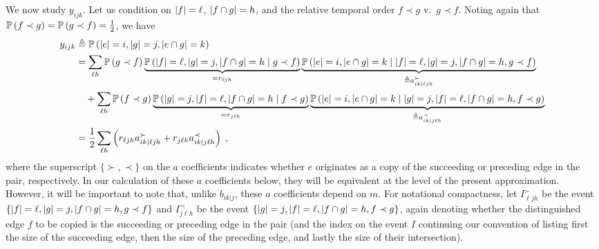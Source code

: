 We now study $y_{ijk}$. 
Let us condition on $\left\lvert f \right\rvert = \ell$, $\left\lvert f \cap g \right\rvert = h$, and the relative temporal order $f \prec g$ v.\ $g \prec f$.
Noting again that $\prob{f \prec g} = \prob{g \prec f} = \frac{1}{2}$, we have
\begin{align}
    y_{ijk} &\eqdef \prob{\abs{e} = i, \abs{g} = j, \abs{e \cap g} = k}  \\
            &= \sum_{\ell h} \prob{g \prec f} \underbrace{\prob{\abs{f} = \ell, \abs{g} = j, \abs{f \cap g} = h\given g \prec f}}_{=r_{\ell j h}} \underbrace{\prob{\abs{e} = i,  \abs{e \cap g} = k \given\abs{f} = \ell, \abs{g} = j,  \abs{f \cap g} = h, g \prec f}}_{\eqdef a^\succ_{ik|\ell j h}}  \\ 
            &\quad+ \sum_{\ell h} \prob{f \prec g} \underbrace{\prob{\abs{g} = j, \abs{f} = \ell,  \abs{f \cap g} = h\given f \prec g}}_{=r_{ j \ell h}} \underbrace{\prob{\abs{e} = i,  \abs{e \cap g} = k \given \abs{g} = j,  \abs{f} = \ell,  \abs{f \cap g} = h, f \prec g}}_{\eqdef a^\prec_{ik|j\ell h}} \\ 
            &= \frac{1}{2}\sum_{\ell h} \paren{r_{\ell j h} a^\succ_{ik|\ell jh} + r_{j \ell h} a^\prec_{ik|j\ell h}}\;,
\end{align}
where the superscript $\{\succ,\prec\}$ on the $a$ coefficients indicates whether $e$ originates as a copy of the succeeding or preceding edge in the pair, respectively. In our calculation of these $a$ coefficients below, they will be equivalent at the level of the present approximation. However, it will be important to note that, unlike $b_{ik|j}$, these $a$ coefficients depend on $m$. 
For notational compactness, let $I^\succ_{\ell jh}$ be the event $\left\{\left\lvert f \right\rvert = \ell, \left\lvert g \right\rvert = j,  \left\lvert f \cap g \right\rvert = h, g \prec f\right\}$ and $I^\prec_{j\ell h}$ be the event $\left\{\left\lvert g \right\rvert = j,  \left\lvert f \right\rvert = \ell,  \left\lvert f \cap g \right\rvert = h, f \prec g\right\}$, again denoting whether the distinguished edge $f$ to be copied is the succeeding or preceding edge in the pair (and the index on the event $I$ continuing our convention of listing first the size of the succeeding edge, then the size of the preceding edge, and lastly the size of their intersection). 

